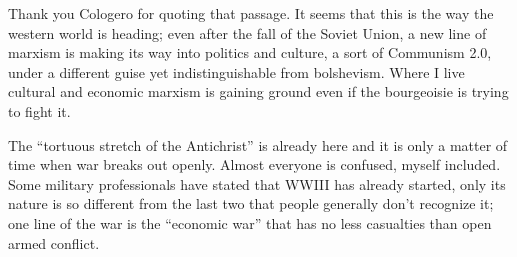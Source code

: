 \begin{footnotesize}
\begin{sffamily}
Thank you Cologero for quoting that passage. It seems that this is the way the western world is heading; even after the fall of the Soviet Union, a new line of marxism is making its way into politics and culture, a sort of Communism 2.0, under a different guise yet indistinguishable from bolshevism. Where I live cultural and economic marxism is gaining ground even if the bourgeoisie is trying to fight it.

The ``tortuous stretch of the Antichrist'' is already here and it is only a matter of time when war breaks out openly. Almost everyone is confused, myself included. Some military professionals have stated that WWIII has already started, only its nature is so different from the last two that people generally don't recognize it; one line of the war is the ``economic war'' that has no less casualties than open armed conflict.


\hfill

\end{sffamily}
\end{footnotesize}

